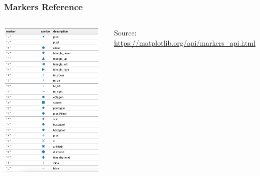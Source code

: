 \documentclass[xcolor={svgnames}]{beamer}
\begin{document}
\begin{frame}[t,fragile]
    \frametitle{Markers Reference}
    \begin{columns}[T]
        \begin{column}{0.45\textwidth}
            \vspace{-1.5mm}
            \includegraphics[height=75mm]{img/ref-markers.png}
        \end{column}
        \begin{column}{0.55\textwidth}
            \vspace{33mm}
            \footnotesize
            Source:\\
            \url{https://matplotlib.org/api/markers_api.html}
        \end{column}
    \end{columns}
\end{frame}
\end{document}
